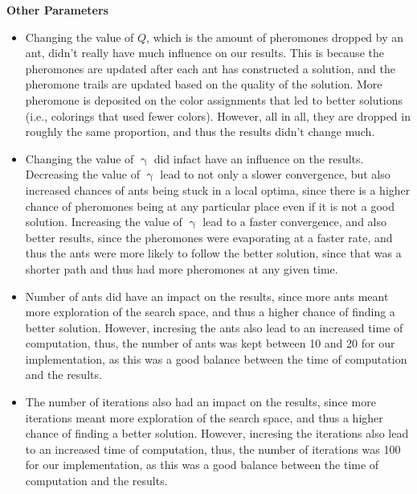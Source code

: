 \documentclass{article}
\theoremstyle{mytheoremstyle}
\theoremstyle{mytheoremstyle}
\theoremstyle{myproblemstyle}
\begin{document}
\textbf{Other Parameters}
\begin{itemize}
    \item Changing the value of $Q$, which is the amount of pheromones dropped by an ant, didn't really have much influence on our results. This is because the pheromones are updated after each ant has constructed a solution, and the pheromone trails are updated based on the quality of the solution. More pheromone is deposited on the color assignments that led to better solutions (i.e., colorings that used fewer colors). However, all in all, they are dropped in roughly the same proportion, and thus the results didn't change much.
    \item Changing the value of $\upgamma$ did infact have an influence on the results. Decreasing the value of $\upgamma$ lead to not only a slower convergence, but also increased chances of ants being stuck in a local optima, since there is a higher chance of pheromones being at any particular place even if it is not a good solution. Increasing the value of $\upgamma$ lead to a faster convergence, and also better results, since the pheromones were evaporating at a faster rate, and thus the ants were more likely to follow the better solution, since that was a shorter path and thus had more pheromones at any given time.
    \item Number of ants did have an impact on the results, since more ants meant more exploration of the search space, and thus a higher chance of finding a better solution. However, incresing the ants also lead to an increased time of computation, thus, the number of ants was kept between 10 and 20 for our implementation, as this was a good balance between the time of computation and the results.
    \item The number of iterations also had an impact on the results, since more iterations meant more exploration of the search space, and thus a higher chance of finding a better solution. However, incresing the iterations also lead to an increased time of computation, thus, the number of iterations was 100 for our implementation, as this was a good balance between the time of computation and the results.
\end{itemize}

\newpage
\end{document}
